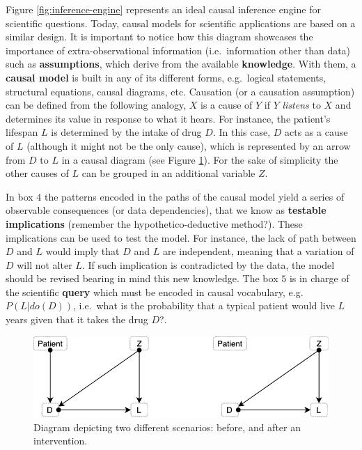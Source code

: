 \documentclass[
]{book}
\begin{document}
Figure \ref{fig:inference-engine} represents an ideal causal inference engine for scientific questions. Today, causal models for scientific applications are based on a similar design. It is important to notice how this diagram showcases the importance of extra-observational information (i.e.~information other than data) such as \textbf{assumptions}, which derive from the available \textbf{knowledge}. With them, a \textbf{causal model} is built in any of its different forms, e.g.~logical statements, structural equations, causal diagrams, etc. Causation (or a causation assumption) can be defined from the following analogy, \(X\) is a cause of \(Y\) if \(Y\) \emph{listens} to \(X\) and determines its value in response to what it hears. For instance, the patient's lifespan \(L\) is determined by the intake of drug \(D\). In this case, \(D\) acts as a cause of \(L\) (although it might not be the only cause), which is represented by an arrow from \(D\) to \(L\) in a causal diagram (see Figure \ref{fig:blueprint}). For the sake of simplicity the other causes of \(L\) can be grouped in an additional variable \(Z\).

In box \(4\) the patterns encoded in the paths of the causal model yield a series of observable consequences (or data dependencies), that we know as \textbf{testable implications} (remember the hypothetico-deductive method?). These implications can be used to test the model. For instance, the lack of path between \(D\) and \(L\) would imply that \(D\) and \(L\) are independent, meaning that a variation of \(D\) will not alter \(L\). If such implication is contradicted by the data, the model should be revised bearing in mind this new knowledge. The box \(5\) is in charge of the scientific \textbf{query} which must be encoded in causal vocabulary, e.g.~\(P(L | do(D))\), i.e.~what is the probability that a typical patient would live \(L\) years given that it takes the drug \(D\)?.

\begin{figure}

{\centering \includegraphics[width=0.7\linewidth]{Figures/blueprint} 

}

\caption{Diagram depicting two different scenarios: before, and after an intervention.}\label{fig:blueprint}
\end{figure}
\end{document}
